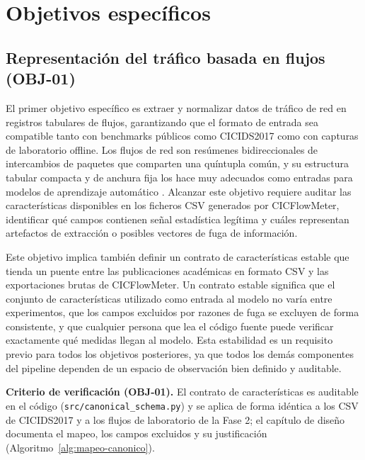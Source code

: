 \section{Objetivos específicos}

\subsection{Representación del tráfico basada en flujos (OBJ-01)}
El primer objetivo específico es extraer y normalizar datos de tráfico de red en registros tabulares de flujos, garantizando que el formato de entrada sea compatible tanto con benchmarks públicos como CICIDS2017 como con capturas de laboratorio offline. Los flujos de red son resúmenes bidireccionales de intercambios de paquetes que comparten una quíntupla común, y su estructura tabular compacta y de anchura fija los hace muy adecuados como entradas para modelos de aprendizaje automático \parencite{Sperotto2010FlowIDS,Umer2017FlowIDS}. Alcanzar este objetivo requiere auditar las características disponibles en los ficheros CSV generados por CICFlowMeter, identificar qué campos contienen señal estadística legítima y cuáles representan artefactos de extracción o posibles vectores de fuga de información.

Este objetivo implica también definir un contrato de características estable que tienda un puente entre las publicaciones académicas en formato CSV y las exportaciones brutas de CICFlowMeter. Un contrato estable significa que el conjunto de características utilizado como entrada al modelo no varía entre experimentos, que los campos excluidos por razones de fuga se excluyen de forma consistente, y que cualquier persona que lea el código fuente puede verificar exactamente qué medidas llegan al modelo. Esta estabilidad es un requisito previo para todos los objetivos posteriores, ya que todos los demás componentes del pipeline dependen de un espacio de observación bien definido y auditable.

\textbf{Criterio de verificación (OBJ-01).} El contrato de características es auditable en el código (\texttt{src/canonical\_schema.py}) y se aplica de forma idéntica a los CSV de CICIDS2017 y a los flujos de laboratorio de la Fase 2; el capítulo de diseño documenta el mapeo, los campos excluidos y su justificación (Algoritmo~\ref{alg:mapeo-canonico}).

